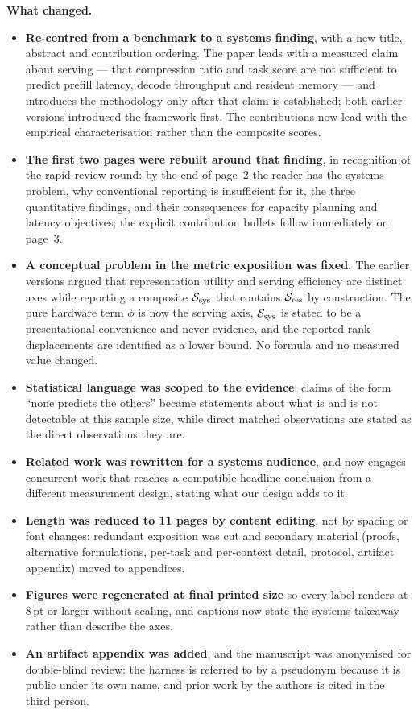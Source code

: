 \documentclass[10pt]{article}
\begin{document}
\medskip
\noindent\textbf{What changed.}
\begin{itemize}
\item \textbf{Re-centred from a benchmark to a systems finding}, with a new
  title, abstract and contribution ordering. The paper leads with a measured
  claim about serving --- that compression ratio and task score are not
  sufficient to predict prefill latency, decode throughput and resident memory
  --- and introduces the methodology only after that claim is established;
  both earlier versions introduced the framework first. The contributions now
  lead with the empirical characterisation rather than the composite scores.
\item \textbf{The first two pages were rebuilt around that finding}, in
  recognition of the rapid-review round: by the end of page~2 the reader has
  the systems problem, why conventional reporting is insufficient for it, the
  three quantitative findings, and their consequences for capacity planning
  and latency objectives; the explicit contribution bullets follow immediately
  on page~3.
\item \textbf{A conceptual problem in the metric exposition was fixed.} The
  earlier versions argued that representation utility and serving efficiency
  are distinct axes while reporting a composite $\mathcal{S}_{\rm sys}$ that
  contains $\mathcal{S}_{\rm res}$ by construction. The pure hardware term
  $\phi$ is now the serving axis, $\mathcal{S}_{\rm sys}$ is stated to be a
  presentational convenience and never evidence, and the reported rank
  displacements are identified as a lower bound. No formula and no measured
  value changed.
\item \textbf{Statistical language was scoped to the evidence}: claims of the
  form ``none predicts the others'' became statements about what is and is not
  detectable at this sample size, while direct matched observations are stated
  as the direct observations they are.
\item \textbf{Related work was rewritten for a systems audience}, and now
  engages concurrent work that reaches a compatible headline conclusion from a
  different measurement design, stating what our design adds to it.
\item \textbf{Length was reduced to 11 pages by content editing}, not by
  spacing or font changes: redundant exposition was cut and secondary material
  (proofs, alternative formulations, per-task and per-context detail, protocol,
  artifact appendix) moved to appendices.
\item \textbf{Figures were regenerated at final printed size} so every label
  renders at 8\,pt or larger without scaling, and captions now state the
  systems takeaway rather than describe the axes.
\item \textbf{An artifact appendix was added}, and the manuscript was
  anonymised for double-blind review: the harness is referred to by a pseudonym
  because it is public under its own name, and prior work by the authors is
  cited in the third person.
\end{itemize}
\end{document}
